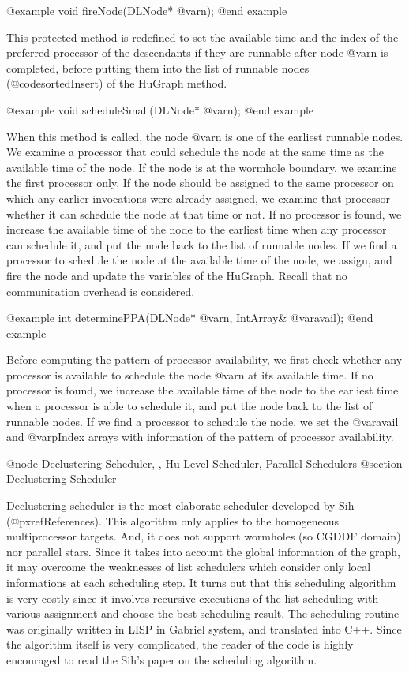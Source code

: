 @example
void fireNode(DLNode* @var{n});
@end example

This protected method is redefined to set the available time and the index
of the preferred processor of the descendants if they are runnable after node
@var{n} is completed, before putting them into the list of runnable nodes
(@code{sortedInsert}) of the HuGraph method.

@example
void scheduleSmall(DLNode* @var{n});
@end example

When this method is called, the node @var{n} is one of the earliest
runnable nodes. We examine a processor that could schedule the node
at the same time as the available time of the node. If the node
is at the wormhole boundary, we examine the first processor only. If
the node should be assigned to the same processor on which any earlier
invocations were already assigned, we examine that processor whether
it can schedule the node at that time or not. If no processor is found,
we increase the available time of the node to the earliest time when
any processor can schedule it, and put the node back to the list of
runnable nodes. If we find a processor to schedule the node at
the available time of the node, we assign, and fire the node and
update the variables of the HuGraph. Recall that no communication
overhead is considered.

@example
int determinePPA(DLNode* @var{n}, IntArray& @var{avail});
@end example

Before computing the pattern of processor availability, we first check
whether any processor is available to schedule the node @var{n} at its
available time. If no processor is found, we increase the available time
of the node to the earliest time when a processor is able to schedule it,
and put the node back to the list of runnable nodes.
If we find a processor to schedule the node, we set the @var{avail} and
@var{pIndex} arrays with information of the pattern of processor availability.

@node Declustering Scheduler, , Hu Level Scheduler, Parallel Schedulers
@section Declustering Scheduler

Declustering scheduler is the most elaborate scheduler developed by Sih
(@pxref{References}). This algorithm only applies to the homogeneous
multiprocessor targets. And, it does not support wormholes (so CGDDF domain)
nor parallel stars. Since it takes into account the global information
of the graph, it may overcome the weaknesses of list schedulers which
consider only local informations at each scheduling step. It turns out
that this scheduling algorithm is very costly since it involves
recursive executions of the list scheduling with various assignment
and choose the best scheduling result. The scheduling routine was
originally written in LISP in Gabriel system, and translated into
C++. Since the algorithm itself is very complicated, the reader of the code
is highly encouraged to read the Sih's paper on the scheduling algorithm.

